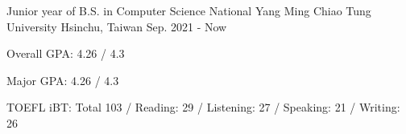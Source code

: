

\begin{cventries}

  \cventry
    {Junior year of B.S. in Computer Science} %
    {National Yang Ming Chiao Tung University} %
    {Hsinchu, Taiwan} %
    {Sep. 2021 - Now} %
    {
      \begin{cvitems} %
        \item {Overall GPA: 4.26 / 4.3}
        \item {Major GPA: 4.26 / 4.3}
        \item {TOEFL iBT: Total 103 / Reading: 29 / Listening: 27 / Speaking: 21 / Writing: 26}
      \end{cvitems}
    }

\end{cventries}


    
    
    


